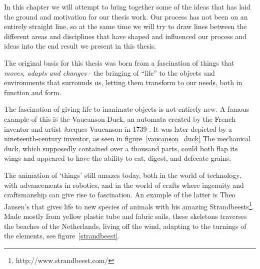 In this chapter we will attempt to bring together some of the ideas that has laid the ground and motivation for our thesis work.
Our process has not been on an entirely straight line, so at the same time we will try to draw lines between the different areas and disciplines that have shaped and influenced our process and ideas into the end result we present in this thesis.  

The original basis for this thesis was born from a fascination of things that \emph{moves, adapts and changes} - the bringing of ``life'' to the objects and environments that surrounds us, letting them transform to our needs, both in function and form. 

The fascination of giving life to inanimate objects is not entirely new.
A famous example of this is the Vaucanson Duck, an automata created by the French inventor and artist Jacques Vaucanson in 1739 \citep{riskin2003defecating}.
It was later depicted by a nineteenth-century inventor, as seen in figure~\ref{vaucanson_duck} 
The mechanical duck, which supposedly contained over a thousand parts, could both flap its wings and appeared to have the ability to eat, digest, and defecate grains.

The animation of `things' still amazes today, both in the world of technology, with advancements in robotics, and in the world of crafts where ingenuity and craftsmanship can give rise to fascination.   
An example of the latter is Theo Jansen's that gives life to new species of animals with his amazing Strandbeests\footnote{http://www.strandbeest.com/}.  
Made mostly from yellow plastic tube and fabric sails, these skeletons traverses the beaches of the Netherlands, living off the wind, adapting to the turnings of the elements, see figure~\ref{strandbeest}.

